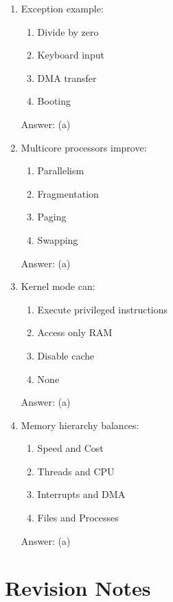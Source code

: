 \begin{enumerate}
\item Exception example:
\begin{enumerate}[label=(\alph*)]
\item Divide by zero
\item Keyboard input
\item DMA transfer
\item Booting
\end{enumerate}
Answer: (a)

\item Multicore processors improve:
\begin{enumerate}[label=(\alph*)]
\item Parallelism
\item Fragmentation
\item Paging
\item Swapping
\end{enumerate}
Answer: (a)

\item Kernel mode can:
\begin{enumerate}[label=(\alph*)]
\item Execute privileged instructions
\item Access only RAM
\item Disable cache
\item None
\end{enumerate}
Answer: (a)

\item Memory hierarchy balances:
\begin{enumerate}[label=(\alph*)]
\item Speed and Cost
\item Threads and CPU
\item Interrupts and DMA
\item Files and Processes
\end{enumerate}
Answer: (a)
\end{enumerate}

\section{Revision Notes}

